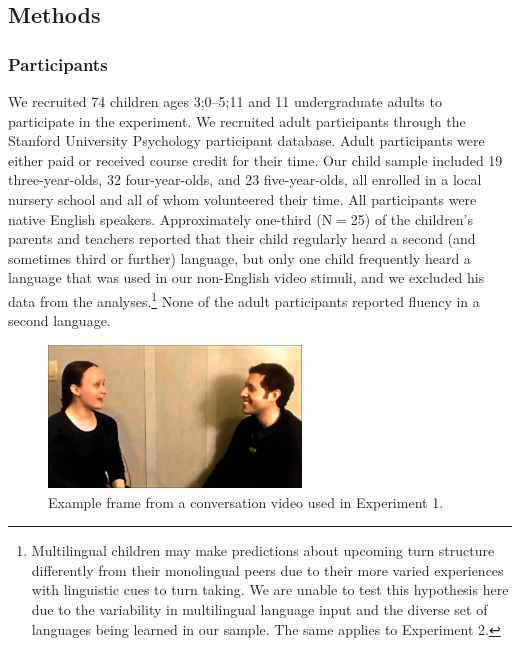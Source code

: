 \documentclass[authoryear, 12pt]{elsarticle}
\begin{document}
\subsection*{Methods}
\label{sec:methods1}

\subsubsection*{Participants}

We recruited 74 children ages 3;0--5;11 and 11 undergraduate adults to participate in the experiment. We recruited adult participants through the Stanford University Psychology participant database. Adult participants were either paid or received course credit for their time. Our child sample included 19 three-year-olds, 32 four-year-olds, and 23 five-year-olds, all enrolled in a local nursery school and all of whom volunteered their time. All participants were native English speakers. Approximately one-third (N$=$25) of the children's parents and teachers reported that their child regularly heard a second (and sometimes third or further) language, but only one child frequently heard a language that was used in our non-English video stimuli, and we excluded his data from the analyses.\footnote{Multilingual children may make predictions about upcoming turn structure differently from their monolingual peers due to their more varied experiences with linguistic cues to turn taking. We are unable to test this hypothesis here due to the variability in multilingual language input and the diverse set of languages being learned in our sample. The same applies to Experiment 2.} None of the adult participants reported fluency in a second language.

\begin{figure}[t]
\begin{center}
\includegraphics[width=0.6\textwidth]{figures/FIG-FL-stim.png}
\end{center}
\caption{Example frame from a conversation video used in Experiment 1.}
\label{fig:speakers}
\end{figure}
\end{document}
